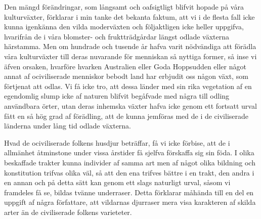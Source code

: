 Den mängd förändringar, som långsamt och oafsigtligt blifvit hopade på våra kulturväxter, förklarar i min tanke det bekanta faktum, att vi i de flesta fall icke kunna igenkänna den vilda moderväxten och följaktligen icke heller uppgifva, hvarifrån de i våra blomster- och fruktträdgårdar längst odlade växterna härstamma. Men om hundrade och tusende år hafva varit nödvändiga att förädla våra kulturväxter till deras nuvarande för menniskan så nyttiga former, så inse vi äfven orsaken, hvarföre hvarken Australien eller Goda Hoppsudden eller något annat af ociviliserade menniskor bebodt land har erbjudit oss någon växt, som förtjenat att odlas. Vi få icke tro, att dessa länder med sin rika vegetation af en egendomlig slump icke af naturen blifvit begåfvade med några till odling användbara örter, utan deras inhemska växter hafva icke genom ett fortsatt urval fått en så hög grad af förädling, att de kunna jemföras med de i de civiliserade länderna under lång tid odlade växterna.

Hvad de ociviliserade folkens husdjur beträffar, få vi icke förbise, att de i allmänhet åtminstone under vissa årstider få sjelfva förskaffa sig sin föda. I olika beskaffade trakter kunna individer af samma art men af något olika bildning och konstitution trifvas olika väl, så att den ena trifves bättre i en trakt, den andra i en annan och på detta sätt kan genom ett slags naturligt urval, såsom vi framdeles få se, bildas tvänne underraser. Detta förklarar måhända till en del en uppgift af några författare, att vildarnas djurraser mera visa karakteren af skilda arter än de civiliserade folkens varieteter.

